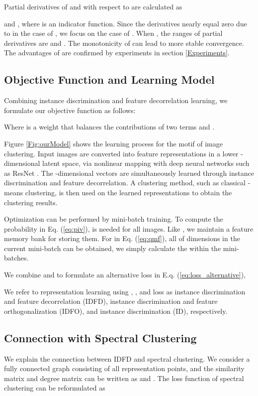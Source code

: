 \documentclass{article} \usepackage{iclr2021_conference,times}
\begin{document}
Partial derivatives of  and  with respect to  are calculated as

and , where  is an indicator function. Since the derivatives nearly equal zero due to  in the case of , we focus on the case of .
When , the ranges of partial derivatives are  and .
The monotonicity of  can lead to more stable convergence. 
The advantages of  are confirmed by experiments in section \ref{Experiments}.



\subsection{Objective Function and Learning Model}
Combining instance discrimination and feature decorrelation learning, we formulate our objective function  as follows:

Where  is a weight that balances the contributions of two terms  and .

Figure \ref{Fig:ourModel} shows the learning process for the motif of image clustering.
Input images  are converted into feature representations  in a lower -dimensional latent space, via nonlinear mapping with deep neural networks such as ResNet \cite{He2015}.
The -dimensional vectors are simultaneously learned through instance discrimination and feature decorrelation. 
A clustering method, such as classical -means clustering, is then used on the learned representations to obtain the clustering results.

Optimization can be performed by mini-batch training. To compute the probability  in Eq. (\ref{eq:piv}),  is needed for all images. Like \cite{wu2018unsupervised, xiaoli2017joint}, we maintain a feature memory bank for storing them. For  in Eq. (\ref{eq:qmf}), all  of  dimensions in the current mini-batch can be obtained, we simply calculate the  within the mini-batches. 

We combine  and  to formulate an alternative loss  in E.q. (\ref{eq:loss_alternative}),

We refer to representation learning using , , and  loss as instance discrimination and feature decorrelation (IDFD), instance discrimination and feature orthogonalization (IDFO), and instance discrimination (ID), respectively.



\subsection{Connection with Spectral Clustering}
\label{sec:spectral}
We explain the connection between IDFD and spectral clustering. 
We consider a fully connected graph consisting of all representation points, and the similarity matrix  and degree matrix  can be written as
 and .
The loss function of spectral clustering \cite{shaham2018spectralnet} can be reformulated as
\end{document}
